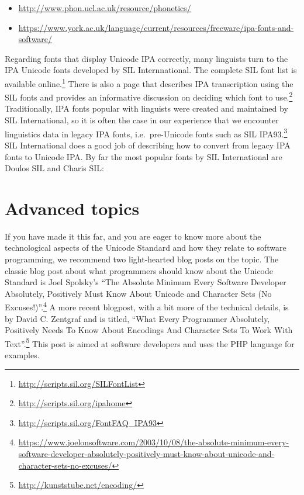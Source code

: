 \begin{itemize}
	\item \url{http://www.phon.ucl.ac.uk/resource/phonetics/}
	\item \url{https://www.york.ac.uk/language/current/resources/freeware/ipa-fonts-and-software/}
\end{itemize}	

Regarding fonts that display Unicode IPA correctly, many linguists turn to the IPA Unicode fonts developed by SIL Internnational. The complete SIL font list is available online.\footnote{\url{http://scripts.sil.org/SILFontList}} There is also a page that describes IPA transcription using the SIL fonts and provides an informative discussion on deciding which font to use.\footnote{\url{http://scripts.sil.org/ipahome}} Traditionally, IPA fonts popular with linguists were created and maintained by SIL International, so it is often the case in our experience that we encounter linguistics data in legacy IPA fonts, i.e.\ pre-Unicode fonts such as SIL IPA93.\footnote{\url{http://scripts.sil.org/FontFAQ_IPA93}} SIL International does a good job of describing how to convert from legacy IPA fonts to Unicode IPA. By far the most popular fonts by SIL International are Doulos SIL and Charis SIL:

\begin{itemize}
	\item \url{https://software.sil.org/doulos/}}
	\item \url{https://software.sil.org/charis/}
\end{itemize}	


\section{Advanced topics}
If you have made it this far, and you are eager to know more about the technological aspects of the Unicode Standard and how they relate to software programming, we recommend two light-hearted blog posts on the topic. The classic blog post about what programmers should know about the Unicode Standard is Joel Spolsky's ``The Absolute Minimum Every Software Developer Absolutely, Positively Must Know About Unicode and Character Sets (No Excuses!)''.\footnote{\url{https://www.joelonsoftware.com/2003/10/08/the-absolute-minimum-every-software-developer-absolutely-positively-must-know-about-unicode-and-character-sets-no-excuses/}} A more recent blogpost, with a bit more of the technical details, is by David C. Zentgraf and is titled, ``What Every Programmer Absolutely, Positively Needs To Know About Encodings And Character Sets To Work With Text''.\footnote{\url{http://kunststube.net/encoding/}} This post is aimed at software developers and uses the PHP language for examples.


